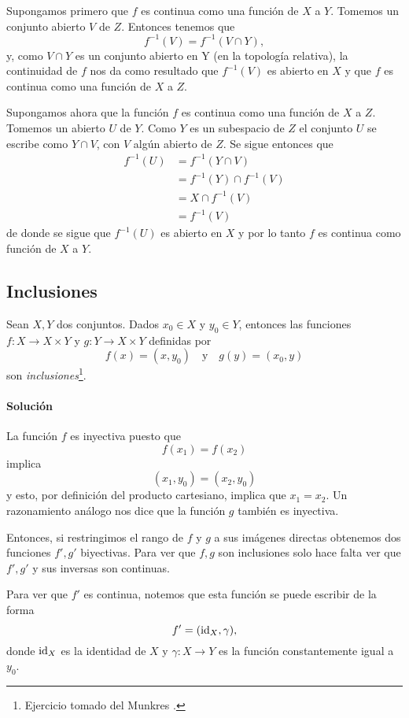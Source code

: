 \documentclass[letterpaper,10pt,final]{article}
\begin{document}
Supongamos primero que $f$ es continua como una función de $X$ a $Y$. Tomemos un conjunto abierto $V$ de $Z$. Entonces tenemos que
\[ f^{-1}(V)=f^{-1}(V\cap Y),\]
y, como $V\cap Y$ es un conjunto abierto en Y (en la topología relativa),
la continuidad de $f$ nos da como resultado que $f^{-1}(V)$ es abierto en $X$ y que $f$ es continua como una función de $X$ a $Z$.

Supongamos ahora que la función $f$ es continua como una función de $X$ a $Z$. Tomemos un abierto $U$ de $Y$. Como $Y$ es un subespacio de $Z$ el conjunto $U$ se escribe como $Y\cap V$, con $V$ algún abierto de $Z$.
Se sigue entonces que
\begin{align*}
	f^{-1}(U) &= f^{-1}(Y\cap V)\\
	          &= f^{-1}(Y) \cap f^{-1}(V)\\
	          &= X\cap f^{-1}(V)\\
	          &= f^{-1}(V)
\end{align*}
de donde se sigue que $f^{-1}(U)$ es abierto en $X$ y por lo tanto $f$ es continua como función de $X$ a $Y$.

\subsection{Inclusiones}

Sean $X,Y$ dos conjuntos. Dados $x_0\in X$ y $y_0\in Y$, entonces las funciones $f:X\to X\times Y$ y 
$g: Y\to X\times Y$ definidas por
\[
f(x)=(x,y_0)\quad\text{y}\quad g(y)=(x_0,y)
\]
son \emph{inclusiones}\footnote{Ejercicio tomado del Munkres \cite[\S18, Nº 4]{munkres_topology_2014}.}.

\paragraph{Solución}

La función $f$ es inyectiva puesto que
\[
f(x_1)=f(x_2)
\]
implica
\[
(x_1,y_0)=(x_2,y_0)
\]
y esto, por definición del producto cartesiano, implica
que $x_1=x_2$. Un razonamiento análogo nos dice que la
función $g$ también es inyectiva.

Entonces, si restringimos el rango de $f$ y $g$ a sus
imágenes directas obtenemos dos funciones $f',g'$
biyectivas. Para ver que $f,g$ son inclusiones solo
hace falta ver que $f',g'$ y sus inversas son
continuas.

Para ver que $f'$ es continua, notemos que esta función
se puede escribir de la forma
\[
f'=(\operatorname{id}_X,\gamma),
\]
donde $\operatorname{id}_X$ es la identidad de $X$ y $\gamma:X\to Y$ 
es la función constantemente igual a $y_0$.
\end{document}
